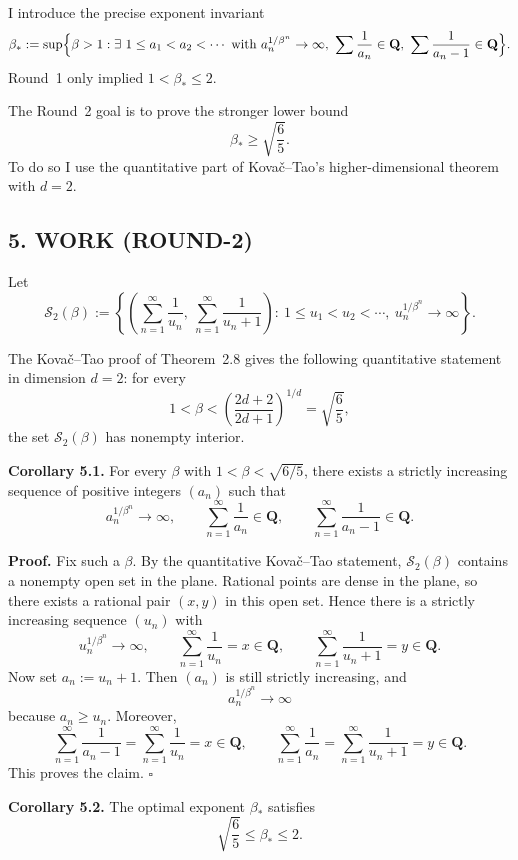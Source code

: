 I introduce the precise exponent invariant
\[
\beta_*:=\sup\Bigl\{\beta>1: \exists\ 1\le a_1<a_2<\cdots\ \mbox{with}\ a_n^{1/\beta^n}\to\infty,\ \sum\frac1{a_n}\in\mathbf Q,\ \sum\frac1{a_n-1}\in\mathbf Q\Bigr\}.
\]
Round~1 only implied $1<\beta_*\le 2$.

The Round~2 goal is to prove the stronger lower bound
\[
\beta_*\ge \sqrt{\frac65}.
\]
To do so I use the quantitative part of Kova\v c--Tao's higher-dimensional theorem with $d=2$.

\subsection*{5. WORK (ROUND-2)}

Let
\[
\mathcal S_2(\beta):=
\left\{
\left(\sum_{n=1}^{\infty}\frac{1}{u_n},\ \sum_{n=1}^{\infty}\frac{1}{u_n+1}\right)
:\ 1\le u_1<u_2<\cdots,\ u_n^{1/\beta^n}\to\infty
\right\}.
\]

The Kova\v c--Tao proof of Theorem~2.8 gives the following quantitative statement in dimension $d=2$:
for every
\[
1<\beta<\left(\frac{2d+2}{2d+1}\right)^{1/d}=\sqrt{\frac65},
\]
the set $\mathcal S_2(\beta)$ has nonempty interior.

\medskip
\noindent
\textbf{Corollary 5.1.}
For every $\beta$ with $1<\beta<\sqrt{6/5}$, there exists a strictly increasing sequence of positive integers $(a_n)$ such that
\[
a_n^{1/\beta^n}\to\infty,
\qquad
\sum_{n=1}^{\infty}\frac{1}{a_n}\in\mathbf Q,
\qquad
\sum_{n=1}^{\infty}\frac{1}{a_n-1}\in\mathbf Q.
\]

\medskip
\noindent
\textbf{Proof.}
Fix such a $\beta$.  By the quantitative Kova\v c--Tao statement, $\mathcal S_2(\beta)$ contains a nonempty open set in the plane.  Rational points are dense in the plane, so there exists a rational pair $(x,y)$ in this open set.  Hence there is a strictly increasing sequence $(u_n)$ with
\[
u_n^{1/\beta^n}\to\infty,
\qquad
\sum_{n=1}^{\infty}\frac{1}{u_n}=x\in\mathbf Q,
\qquad
\sum_{n=1}^{\infty}\frac{1}{u_n+1}=y\in\mathbf Q.
\]
Now set $a_n:=u_n+1$.  Then $(a_n)$ is still strictly increasing, and
\[
a_n^{1/\beta^n}\to\infty
\]
because $a_n\ge u_n$.  Moreover,
\[
\sum_{n=1}^{\infty}\frac{1}{a_n-1}=\sum_{n=1}^{\infty}\frac{1}{u_n}=x\in\mathbf Q,
\qquad
\sum_{n=1}^{\infty}\frac{1}{a_n}=\sum_{n=1}^{\infty}\frac{1}{u_n+1}=y\in\mathbf Q.
\]
This proves the claim.
\hfill $\square$

\medskip
\noindent
\textbf{Corollary 5.2.}
The optimal exponent $\beta_*$ satisfies
\[
\sqrt{\frac65}\le \beta_*\le 2.
\]

